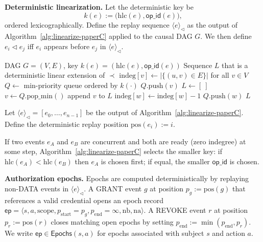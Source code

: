 \documentclass[10pt,journal,compsoc]{IEEEtran}
\begin{document}
\medskip
\noindent\textbf{Deterministic linearization.}
Let the deterministic key be
\[
  k(e) := \big(\mathrm{hlc}(e),\mathsf{op\_id}(e)\big),
\]
ordered lexicographically. Define the replay sequence $\langle e\rangle_{\triangleleft}$ as the output of Algorithm~\ref{alg:linearize-paperC} applied to the causal DAG $G$. We then define $e_i \triangleleft e_j$ iff $e_i$ appears before $e_j$ in $\langle e\rangle_{\triangleleft}$.

\begin{algorithm}[t]
\caption{Deterministic linearization of a causal DAG}
\label{alg:linearize-paperC}
\begin{algorithmic}[1]
\Require DAG $G=(V,E)$, key $k(e)=(\mathrm{hlc}(e),\mathsf{op\_id}(e))$
\Ensure Sequence $L$ that is a deterministic linear extension of $\prec$
\State $\mathrm{indeg}[v] \gets |\{(u,v)\in E\}|$ for all $v\in V$
\State $Q \gets$ min-priority queue ordered by $k(\cdot)$
  \State $Q.\mathrm{push}(v)$
\EndFor
\State $L \gets [\ ]$
  \State $v \gets Q.\mathrm{pop\_min}()$
  \State append $v$ to $L$
    \State $\mathrm{indeg}[w] \gets \mathrm{indeg}[w]-1$
      \State $Q.\mathrm{push}(w)$
    \EndIf
  \EndFor
\EndWhile
\State \Return $L$
\end{algorithmic}
\end{algorithm}

\noindent Let $\langle e \rangle_{\triangleleft} = [e_0,\dots,e_{n-1}]$ be the output of Algorithm~\ref{alg:linearize-paperC}.
Define the deterministic replay position $\mathrm{pos}(e_i) := i$.

If two events $e_A$ and $e_B$ are concurrent and both are ready (zero indegree) at some step, Algorithm~\ref{alg:linearize-paperC} selects the smaller key: if $\mathrm{hlc}(e_A)<\mathrm{hlc}(e_B)$ then $e_A$ is chosen first; if equal, the smaller $\mathsf{op\_id}$ is chosen.


\medskip
\noindent\textbf{Authorization epochs.}
Epochs are computed deterministically by replaying non-\textsc{DATA} events in $\langle e \rangle_{\triangleleft}$.
A \textsc{GRANT} event $g$ at position $p_g := \mathrm{pos}(g)$ that references a valid credential opens an epoch record
$\mathsf{ep} = \langle s,a,\mathrm{scope}, p_{\mathrm{start}}{=}p_g, p_{\mathrm{end}}{=}\infty, \mathrm{nb}, \mathrm{na} \rangle$.
A \textsc{REVOKE} event $r$ at position $p_r := \mathrm{pos}(r)$ closes matching open epochs by setting
$p_{\mathrm{end}} := \min(p_{\mathrm{end}}, p_r)$.
We write $\mathsf{ep}\in \mathsf{Epochs}(s,a)$ for epochs associated with subject $s$ and action $a$.
\end{document}
